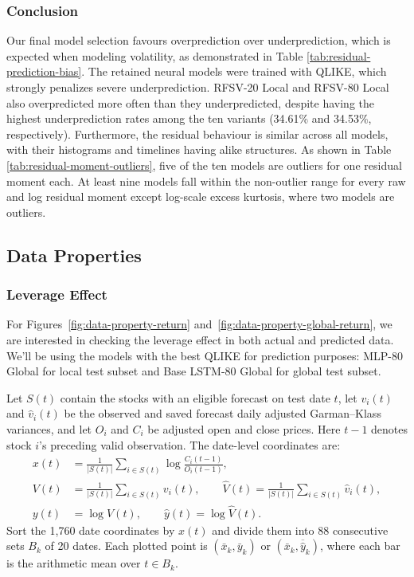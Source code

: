 \documentclass[12pt,a4paper]{article}
\numberwithin{equation}{section}
\numberwithin{table}{section}
\numberwithin{figure}{section}
\begin{document}
\subsubsection{Conclusion}
Our final model selection favours overprediction over underprediction, which is expected when modeling volatility, as demonstrated in Table \ref{tab:residual-prediction-bias}. The retained neural models were trained with QLIKE, which strongly penalizes severe underprediction. RFSV-20 Local and RFSV-80 Local also overpredicted more often than they underpredicted, despite having the highest underprediction rates among the ten variants (34.61\% and 34.53\%, respectively).  Furthermore, the residual behaviour is similar across all models, with their histograms and timelines having alike structures. As shown in Table \ref{tab:residual-moment-outliers}, five of the ten models are outliers for one residual moment each. At least nine models fall within the non-outlier range for every raw and log residual moment except log-scale excess kurtosis, where two models are outliers.


\subsection{Data Properties}
\subsubsection{Leverage Effect}
For Figures~\ref{fig:data-property-return} and~\ref{fig:data-property-global-return}, we are interested in checking the leverage effect in both actual and predicted data. We'll be using the models with the best QLIKE for prediction purposes: MLP-80 Global for local test subset and Base LSTM-80 Global for global test subset.

Let $S(t)$ contain the stocks with an eligible forecast on test date $t$, let $v_i(t)$ and $\widehat v_i(t)$ be the observed and saved forecast daily adjusted Garman--Klass variances, and let $O_i$ and $C_i$ be adjusted open and close prices. Here $t-1$ denotes stock $i$'s preceding valid observation. The date-level coordinates are:
\begin{equation}\label{eq:property-return-coordinates}
\begin{aligned}
x(t)&=\frac{1}{|S(t)|}\sum_{i\in S(t)}\log\frac{C_i(t-1)}{O_i(t-1)},\\
V(t)&=\frac{1}{|S(t)|}\sum_{i\in S(t)}v_i(t),\qquad
\widehat V(t)=\frac{1}{|S(t)|}\sum_{i\in S(t)}\widehat v_i(t),\\
y(t)&=\log V(t),\qquad \widehat y(t)=\log\widehat V(t).
\end{aligned}
\end{equation}
Sort the 1,760 date coordinates by $x(t)$ and divide them into 88 consecutive sets $B_k$ of 20 dates. Each plotted point is $(\bar x_k,\bar y_k)$ or $(\bar x_k,\overline{\widehat y}_k)$, where each bar is the arithmetic mean over $t\in B_k$. 
\end{document}
